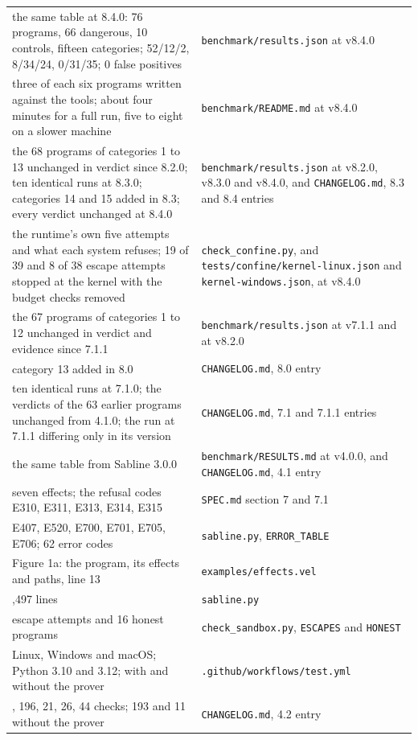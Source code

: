 \documentclass[
]{article}
\begin{document}
{\begin{longtable}[]{@{}
  >{\raggedright\arraybackslash}p{}
  >{\raggedright\arraybackslash}p{}@{}}
the same table at 8.4.0: 76 programs, 66 dangerous, 10 controls, fifteen
categories; 52/12/2, 8/34/24, 0/31/35; 0 false positives &
\texttt{benchmark/results.json} at v8.4.0 \\
three of each six programs written against the tools; about four minutes
for a full run, five to eight on a slower machine &
\texttt{benchmark/README.md} at v8.4.0 \\
the 68 programs of categories 1 to 13 unchanged in verdict since 8.2.0;
ten identical runs at 8.3.0; categories 14 and 15 added in 8.3; every
verdict unchanged at 8.4.0 & \texttt{benchmark/results.json} at v8.2.0,
v8.3.0 and v8.4.0, and \texttt{CHANGELOG.md}, 8.3 and 8.4 entries \\
the runtime's own five attempts and what each system refuses; 19 of 39
and 8 of 38 escape attempts stopped at the kernel with the budget checks
removed & \texttt{check\_confine.py}, and
\texttt{tests/confine/kernel-linux.json} and
\texttt{kernel-windows.json}, at v8.4.0 \\
the 67 programs of categories 1 to 12 unchanged in verdict and evidence
since 7.1.1 & \texttt{benchmark/results.json} at v7.1.1 and at v8.2.0 \\
category 13 added in 8.0 & \texttt{CHANGELOG.md}, 8.0 entry \\
ten identical runs at 7.1.0; the verdicts of the 63 earlier programs
unchanged from 4.1.0; the run at 7.1.1 differing only in its version &
\texttt{CHANGELOG.md}, 7.1 and 7.1.1 entries \\
the same table from Sabline 3.0.0 & \texttt{benchmark/RESULTS.md} at
v4.0.0, and \texttt{CHANGELOG.md}, 4.1 entry \\
seven effects; the refusal codes E310, E311, E313, E314, E315 &
\texttt{SPEC.md} section 7 and 7.1 \\
E407, E520, E700, E701, E705, E706; 62 error codes &
\texttt{sabline.py}, \texttt{ERROR\_TABLE} \\
Figure 1a: the program, its effects and paths, line 13 &
\texttt{examples/effects.vel} \\
13,497 lines & \texttt{sabline.py} \\
34 escape attempts and 16 honest programs & \texttt{check\_sandbox.py},
\texttt{ESCAPES} and \texttt{HONEST} \\
Linux, Windows and macOS; Python 3.10 and 3.12; with and without the
prover & \texttt{.github/workflows/test.yml} \\
114, 196, 21, 26, 44 checks; 193 and 11 without the prover &
\texttt{CHANGELOG.md}, 4.2 entry \\

\end{longtable}}
\end{document}
